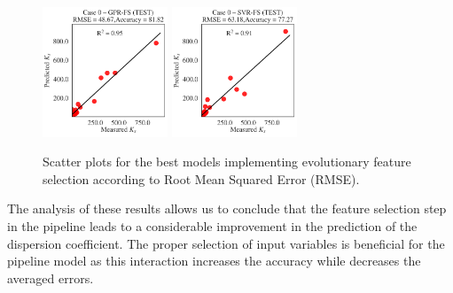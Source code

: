 \documentclass[a4paper,12pt, english]{article}
\begin{document}
\begin{figure}[!htb] \centering 
 \includegraphics[width=0.33245\textwidth]{./scatter/eml____300dpi_scatter_best_model___gpr_fs__case_0__test}
 \includegraphics[width=0.33245\textwidth]{./scatter/eml____300dpi_scatter_best_model___svr_fs__case_0__test}
 \caption{\label{fig:eml____300dpi_scatter_best_model_fs___ldc}
 Scatter plots for the best models implementing evolutionary feature selection according to Root Mean Squared Error (RMSE).}
\end{figure}

The analysis of these results allows us to conclude that the feature selection step in the pipeline leads to a considerable improvement in the prediction of the dispersion coefficient. The proper selection of input variables is beneficial for the pipeline model as this interaction increases the accuracy while decreases the averaged errors.
\end{document}
